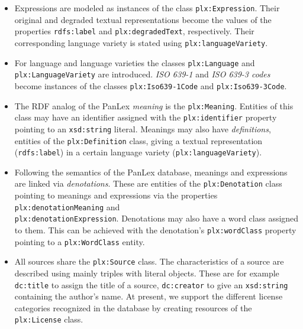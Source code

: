 \documentclass[sw]{iosart2c}
\begin{document}
\begin{itemize}
  \item Expressions are modeled as instances of the class \texttt{\small plx:Expression}.
    Their original and degraded textual representations become the values of the properties \texttt{\small rdfs:label} and \texttt{\small plx:degradedText}, respectively.
    Their corresponding language variety is stated using \texttt{\small plx:languageVariety}.
  \item For language and language varieties the classes \texttt{\small plx:Language} and \texttt{\small plx:LanguageVariety} are introduced.
    \emph{ISO 639-1} and \emph{ISO 639-3 codes} become instances of the classes \texttt{\small plx:Iso639-1Code} and \texttt{\small plx:Iso639-3Code}.
  \item The RDF analog of the PanLex \emph{meaning} is the \texttt{\small plx:Meaning}.
    Entities of this class may have an identifier assigned with the \texttt{\small plx:identifier} property pointing to an \texttt{\small xsd:string} literal.
    Meanings may also have \emph{definitions}, entities of the \texttt{\small plx:Definition} class, giving a textual representation (\texttt{\small rdfs:label}) in a certain language variety (\texttt{\small plx:languageVariety}).
  \item Following the semantics of the PanLex database, meanings and expressions are linked via \emph{denotations}.
    These are entities of the \texttt{\small plx:Denotation} class pointing to meanings and expressions via the properties \texttt{\small plx:denotationMeaning} and \\ \texttt{\small plx:denotationExpression}.
    Denotations may also have a word class assigned to them.
    This can be achieved with the denotation's \texttt{\small plx:wordClass} property pointing to a \texttt{\small plx:WordClass} entity.
  \item All sources share the \texttt{\small plx:Source} class.
    The characteristics of a source are described using mainly triples with literal objects.
    These are for example \texttt{\small dc:title} to assign the title of a source, \texttt{\small dc:creator} to give an \texttt{\small xsd:string} containing the author's name. At present, we support the different license categories recognized in the database by creating resources of the \texttt{\small plx:License} class.
\end{itemize}
\end{document}
